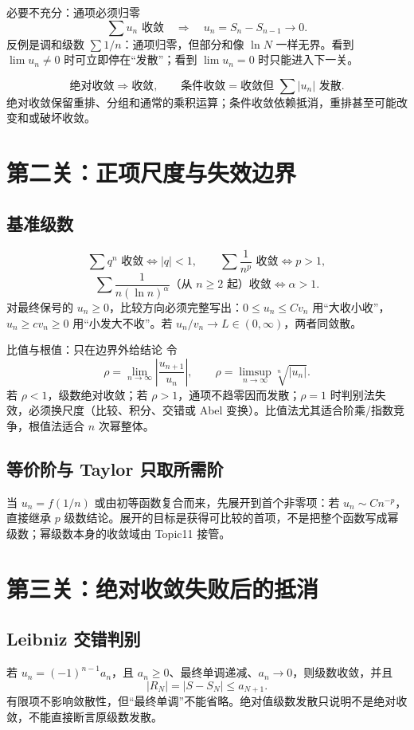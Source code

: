 \documentclass[11pt,a4paper,fontset=fandol]{ctexart}
\begin{document}
\begin{corebox}{必要不充分：通项必须归零}
\[
\sum u_n\text{ 收敛}\quad\Longrightarrow\quad u_n=S_n-S_{n-1}\longrightarrow0.
\]
反例是调和级数 $\sum 1/n$：通项归零，但部分和像 $\ln N$ 一样无界。看到 $\lim u_n\ne0$ 时可立即停在“发散”；看到 $\lim u_n=0$ 时只能进入下一关。
\end{corebox}

\[
\text{绝对收敛}\Rightarrow\text{收敛},\qquad
\text{条件收敛}=\text{收敛但 }\sum\lvert u_n\rvert\text{ 发散}.
\]
绝对收敛保留重排、分组和通常的乘积运算；条件收敛依赖抵消，重排甚至可能改变和或破坏收敛。

\section{第二关：正项尺度与失效边界}
\subsection{基准级数}
\[
\sum q^n\text{ 收敛}\iff \lvert q\rvert<1,\qquad
\sum\frac1{n^p}\text{ 收敛}\iff p>1,
\]
\[
\sum\frac1{n(\ln n)^\alpha}\text{（从 }n\ge2\text{ 起）收敛}\iff\alpha>1.
\]
对最终保号的 $u_n\ge0$，比较方向必须完整写出：$0\le u_n\le Cv_n$ 用“大收小收”，$u_n\ge cv_n\ge0$ 用“小发大不收”。若 $u_n/v_n\to L\in(0,\infty)$，两者同敛散。

\begin{methodbox}{比值与根值：只在边界外给结论}
令
\[
\rho=\lim_{n\to\infty}\left\lvert\frac{u_{n+1}}{u_n}\right\rvert,
\qquad
\rho=\limsup_{n\to\infty}\sqrt[n]{\lvert u_n\rvert}.
\]
若 $\rho<1$，级数绝对收敛；若 $\rho>1$，通项不趋零因而发散；$\rho=1$ 时判别法失效，必须换尺度（比较、积分、交错或 Abel 变换）。比值法尤其适合阶乘/指数竞争，根值法适合 $n$ 次幂整体。
\end{methodbox}

\subsection{等价阶与 Taylor 只取所需阶}
当 $u_n=f(1/n)$ 或由初等函数复合而来，先展开到首个非零项：若 $u_n\sim Cn^{-p}$，直接继承 $p$ 级数结论。展开的目标是获得可比较的首项，不是把整个函数写成幂级数；幂级数本身的收敛域由 Topic11 接管。

\section{第三关：绝对收敛失败后的抵消}
\subsection{Leibniz 交错判别}
若 $u_n=(-1)^{n-1}a_n$，且 $a_n\ge0$、最终单调递减、$a_n\to0$，则级数收敛，并且
\[
\lvert R_N\rvert=\lvert S-S_N\rvert\le a_{N+1}.
\]
有限项不影响敛散性，但“最终单调”不能省略。绝对值级数发散只说明不是绝对收敛，不能直接断言原级数发散。
\end{document}
